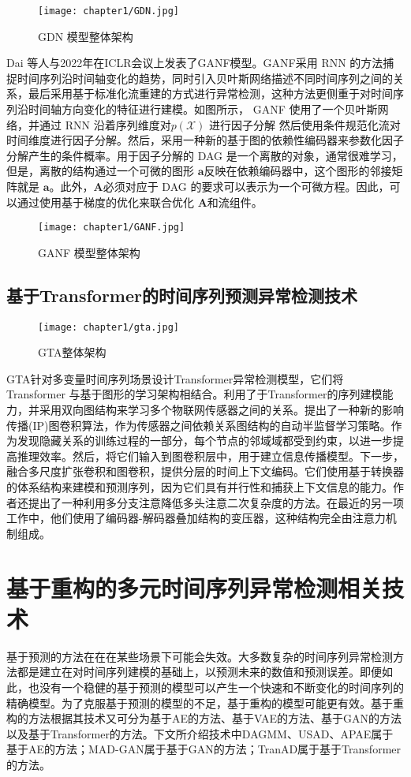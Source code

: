\begin{figure}[htb]
    \centering
    \texttt{[image: chapter1/GDN.jpg]}
    \caption{GDN 模型整体架构\cite{gdn}}
    \end{figure}

Dai 等人\cite{ganf}与2022年在ICLR会议上发表了GANF模型。GANF采用 RNN 的方法捕捉时间序列沿时间轴变化的趋势，同时引入贝叶斯网络描述不同时间序列之间的关系，最后采用基于标准化流重建的方式进行异常检测，这种方法更侧重于对时间序列沿时间轴方向变化的特征进行建模。如图所示， GANF 使用了一个贝叶斯网络，并通过 RNN 沿着序列维度对$p(\mathcal{X})$ 进行因子分解 然后使用条件规范化流对时间维度进行因子分解。然后，采用一种新的基于图的依赖性编码器来参数化因子分解产生的条件概率。用于因子分解的 DAG 是一个离散的对象，通常很难学习，但是，离散的结构通过一个可微的图形 $\mathbf { a } $反映在依赖编码器中，这个图形的邻接矩阵就是 $\mathbf { a } $。此外，$\mathbf { A } $必须对应于 DAG 的要求可以表示为一个可微方程。因此，可以通过使用基于梯度的优化来联合优化 $\mathbf { A } $和流组件。
\begin{figure}[htb]
    \centering
    \texttt{[image: chapter1/GANF.jpg]}
    \caption{GANF 模型整体架构\cite{ganf}}
    \end{figure}

\subsection{基于Transformer的时间序列预测异常检测技术}
\begin{figure}[htb]
    \centering
    \texttt{[image: chapter1/gta.jpg]}
    \caption{GTA整体架构\cite{gat}}
    \end{figure}
GTA\cite{gat}针对多变量时间序列场景设计Transformer异常检测模型，它们将 Transformer 与基于图形的学习架构相结合。利用了于Transformer的序列建模能力，并采用双向图结构来学习多个物联网传感器之间的关系。提出了一种新的影响传播(IP)图卷积算法，作为传感器之间依赖关系图结构的自动半监督学习策略。作为发现隐藏关系的训练过程的一部分，每个节点的邻域域都受到约束，以进一步提高推理效率。然后，将它们输入到图卷积层中，用于建立信息传播模型。下一步，融合多尺度扩张卷积和图卷积，提供分层的时间上下文编码。它们使用基于转换器的体系结构来建模和预测序列，因为它们具有并行性和捕获上下文信息的能力。作者还提出了一种利用多分支注意降低多头注意二次复杂度的方法。在最近的另一项工作中，他们使用了编码器-解码器叠加结构的变压器，这种结构完全由注意力机制组成。

\section{基于重构的多元时间序列异常检测相关技术}
基于预测的方法在在在某些场景下可能会失效。大多数复杂的时间序列异常检测方法都是建立在对时间序列建模的基础上，以预测未来的数值和预测误差。即便如此，也没有一个稳健的基于预测的模型可以产生一个快速和不断变化的时间序列的精确模型。为了克服基于预测的模型的不足，基于重构的模型可能更有效。基于重构的方法根据其技术又可分为基于AE的方法、基于VAE的方法、基于GAN的方法以及基于Transformer的方法。下文所介绍技术中DAGMM、USAD、APAE属于基于AE的方法；MAD-GAN属于基于GAN的方法；TranAD属于基于Transformer的方法。

